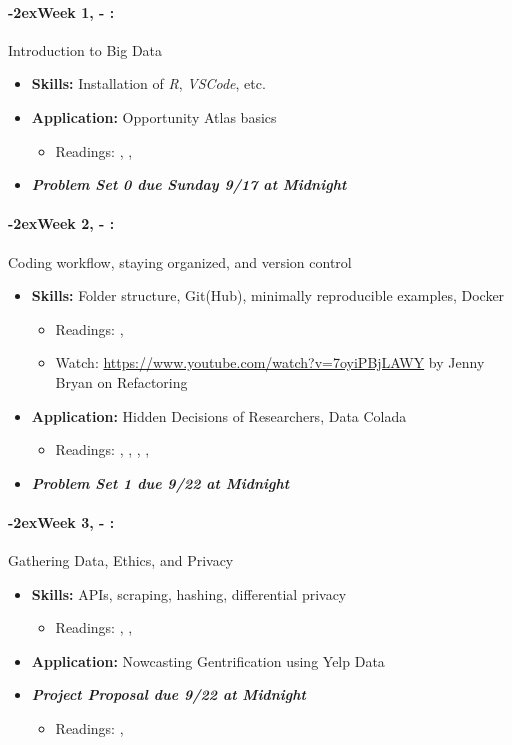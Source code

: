 \documentclass[11pt]{article}
\newcommand{\week}[1]{%
  \paragraph*{\kern-2ex\quad #1, \AdvanceDate[1]\syldate{\today} - \AdvanceDate[2]\syldate{\today}:}%
  \ifdim\wd1=\wd\MONDAY
    \AdvanceDate[7]
  \else
    \AdvanceDate[7]
  \fi%
}
\begin{document}
\normalsize

\SetDate[28/08/2023]
\week{Week 1} Introduction to Big Data
\begin{itemize}
  \item \textbf{Skills:} Installation of \textit{R}, \textit{VSCode}, etc.
  \item \textbf{Application:} Opportunity Atlas basics
  \begin{itemize}
    \item Readings: \textbf{\cite{chetty2018opportunityatlas}}, \cite{chetty2020opportunity}, \cite{einav2014ageofbigdata}
  \end{itemize}
  \item \textit{\textbf{Problem Set 0 due Sunday 9/17 at Midnight}}
\end{itemize}
\week{Week 2} Coding workflow, staying organized, and version control
\begin{itemize}
  \item \textbf{Skills:} Folder structure, Git(Hub), minimally reproducible examples, Docker
  \begin{itemize}
    \item Readings: \textbf{\cite{gentzkowshapiro2014code}}, \cite{mcdermott2022docker}
    \item Watch: \url{https://www.youtube.com/watch?v=7oyiPBjLAWY} by Jenny Bryan on Refactoring
  \end{itemize}
  \item \textbf{Application:} Hidden Decisions of Researchers, Data Colada
  \begin{itemize}
    \item Readings: \textbf{\cite{huntingtonklen2021influence}}, \cite{tinyverse}, \cite{wickhamtidy}, \cite{datacolada2021groundhog}, \cite{datacolada2022groundhog}
  \end{itemize}
  \item \textit{\textbf{Problem Set 1 due 9/22 at Midnight}}
\end{itemize}
\week{Week 3} Gathering Data, Ethics, and Privacy
\begin{itemize}
\item \textbf{Skills:} APIs, scraping, hashing, differential privacy
\begin{itemize}
  \item Readings: \textbf{\cite{chetty2019privacy}}, \cite{abowd2019privacy}, \cite{apiintro}
\end{itemize}
\item \textbf{Application:} Nowcasting Gentrification using Yelp Data
\item \textit{\textbf{Project Proposal due 9/22 at Midnight}}
\begin{itemize}
  \item Readings: \textbf{\cite{glaeser2018gentrification}}, \cite{glaeser2017local}
\end{itemize}
\end{itemize} 
\end{document}
